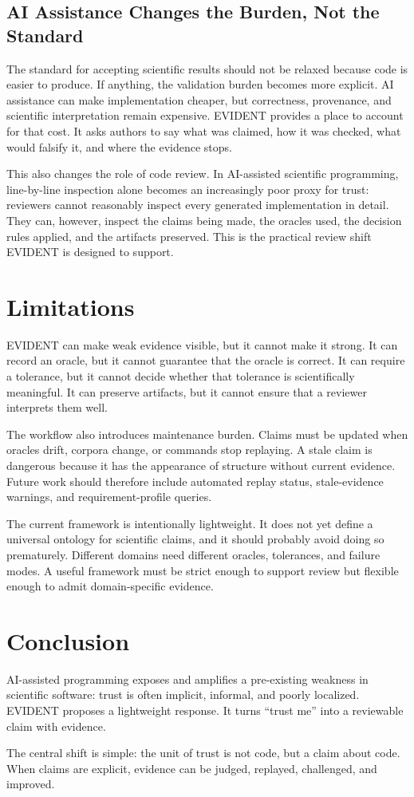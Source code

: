 \documentclass[10pt,twoside]{article}
\begin{document}
\subsection{AI Assistance Changes the Burden, Not the Standard}

The standard for accepting scientific results should not be relaxed because code
is easier to produce. If anything, the validation burden becomes more explicit.
AI assistance can make implementation cheaper, but correctness, provenance, and
scientific interpretation remain expensive. EVIDENT provides a place to account
for that cost. It asks authors to say what was claimed, how it was checked, what
would falsify it, and where the evidence stops.

This also changes the role of code review. In AI-assisted scientific
programming, line-by-line inspection alone becomes an increasingly poor proxy
for trust: reviewers cannot reasonably inspect every generated implementation in
detail. They can, however, inspect the claims being made, the oracles used, the
decision rules applied, and the artifacts preserved. This is the practical
review shift EVIDENT is designed to support.

\section{Limitations}

EVIDENT can make weak evidence visible, but it cannot make it strong. It can
record an oracle, but it cannot guarantee that the oracle is correct. It can
require a tolerance, but it cannot decide whether that tolerance is
scientifically meaningful. It can preserve artifacts, but it cannot ensure that
a reviewer interprets them well.

The workflow also introduces maintenance burden. Claims must be updated when
oracles drift, corpora change, or commands stop replaying. A stale claim is
dangerous because it has the appearance of structure without current evidence.
Future work should therefore include automated replay status, stale-evidence
warnings, and requirement-profile queries.

The current framework is intentionally lightweight. It does not yet define
a universal ontology for scientific claims, and it should probably avoid doing
so prematurely. Different domains need different oracles, tolerances, and
failure modes. A useful framework must be strict enough to support review but
flexible enough to admit domain-specific evidence.

\section{Conclusion}

AI-assisted programming exposes and amplifies a pre-existing weakness in
scientific software: trust is often implicit, informal, and poorly localized.
EVIDENT proposes a lightweight response. It turns ``trust me'' into a
reviewable claim with evidence.

The central shift is simple: the unit of trust is not code, but a claim about
code. When claims are explicit, evidence can be judged, replayed, challenged,
and improved.



\end{document}
